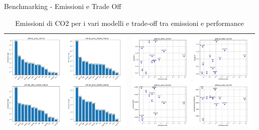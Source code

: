 \begin{frame}{Benchmarking - Emissioni e Trade Off}
    \begin{table}[H]
        \centering
        \footnotesize
        \setlength\tabcolsep{0pt}
        \begin{tabularx}{\textwidth}{|X|X|}
            \hline
            \includegraphics[width=\linewidth, trim=0 0 0 0]{images/EmissioniLFM.png} & 
            \includegraphics[width=\linewidth, trim=0 0 0 0]{images/TradeOff.png} \\
            \hline
        \end{tabularx}
        \caption{Emissioni di CO2 per i vari modelli e trade-off tra emissioni e performance}
    \end{table}
\end{frame}

